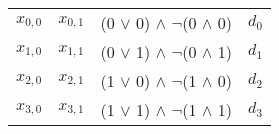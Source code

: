 \begin{table}
    \centering  
    \begin{tabular}{cccc}
        \(x_{0,0}\) \color{blue}{0} & \(x_{0,1}\) \color{blue}{0} & (0 \(\lor\) 0)  \(\land\) \(\lnot\)(0 \(\land\) 0) & \(d_0\) \color{green}{0} \\
        \(x_{1,0}\) \color{blue}{0} & \(x_{1,1}\) \color{red}{1} & (0 \(\lor\) 1)  \(\land\) \(\lnot\)(0 \(\land\) 1) & \(d_1\) \color{green}{1} \\
        \(x_{2,0}\) \color{red}{1} & \(x_{2,1}\) \color{blue}{0} & (1 \(\lor\) 0)  \(\land\) \(\lnot\)(1 \(\land\) 0) & \(d_2\) \color{green}{1} \\
        \(x_{3,0}\) \color{red}{1} & \(x_{3,1}\) \color{red}{1} & (1 \(\lor\) 1)  \(\land\) \(\lnot\)(1 \(\land\) 1) & \(d_3\) \color{green}{0} \\
    \end{tabular}
\end{table}